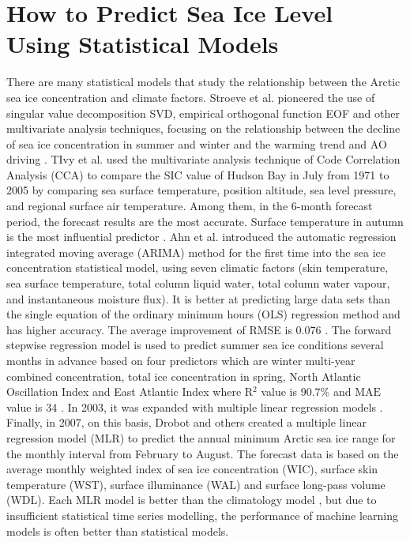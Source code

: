 \section{How to Predict Sea Ice Level Using Statistical Models}
There are many statistical models that study the relationship between the Arctic sea ice concentration and climate factors. Stroeve et al. pioneered the use of singular value decomposition SVD, empirical orthogonal function EOF and other multivariate analysis techniques, focusing on the relationship between the decline of sea ice concentration in summer and winter and the warming trend and AO driving \cite{stroeve_frei_mccreight_ghatak_2008}. TIvy et al. used the multivariate analysis technique of Code Correlation Analysis (CCA) to compare the SIC value of Hudson Bay in July from 1971 to 2005 by comparing sea surface temperature, position altitude, sea level pressure, and regional surface air temperature. Among them, in the 6-month forecast period, the forecast results are the most accurate. Surface temperature in autumn is the most influential predictor \cite{tivy2011origins}. Ahn et al. introduced the automatic regression integrated moving average (ARIMA) method for the first time into the sea ice concentration statistical model, using seven climatic factors (skin temperature, sea surface temperature, total column liquid water, total column water vapour, and instantaneous moisture flux). It is better at predicting large data sets than the single equation of the ordinary minimum hours (OLS) regression method and has higher accuracy. The average improvement of RMSE is 0.076 \cite{ahn2014statistical}. The forward stepwise regression model is used to predict summer sea ice conditions several months in advance based on four predictors which are winter multi-year combined concentration, total ice concentration in spring, North Atlantic Oscillation Index and East Atlantic Index where $\text{R}{^2}$ value is 90.7\% and $\text{MAE}$ value is 34 \cite{drobot2002practical}. In 2003, it was expanded with multiple linear regression models \cite{drobot2003long}. Finally, in 2007, on this basis, Drobot and others created a multiple linear regression model (MLR) to predict the annual minimum Arctic sea ice range for the monthly interval from February to August. The forecast data is based on the average monthly weighted index of sea ice concentration (WIC), surface skin temperature (WST), surface illuminance (WAL) and surface long-pass volume (WDL). Each MLR model is better than the climatology model \cite{drobot2006long}, but due to insufficient statistical time series modelling, the performance of machine learning models is often better than statistical models.

